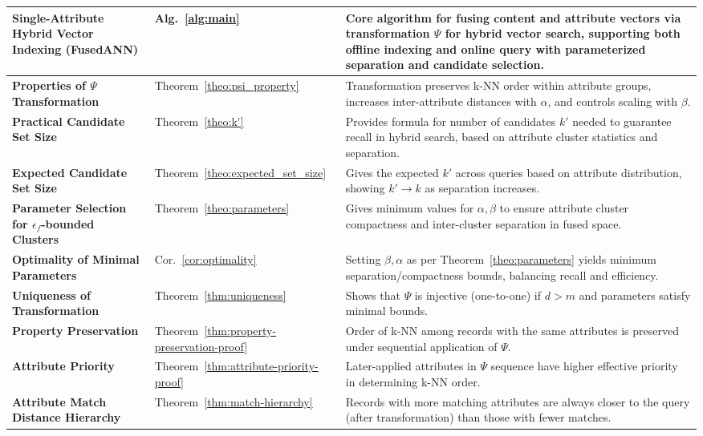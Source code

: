 \documentclass[numbers,sort]{article}
\begin{document}
\begin{longtable}{p{4.5cm} p{1.5cm} p{7.2cm}}
\textbf{Single-Attribute Hybrid Vector Indexing (FusedANN)} & Alg.~\ref{alg:main} & Core algorithm for fusing content and attribute vectors via transformation $\Psi$ for hybrid vector search, supporting both offline indexing and online query with parameterized separation and candidate selection. \\
\midrule
\textbf{Properties of $\Psi$ Transformation} & Theorem~\ref{theo:psi_property} & Transformation preserves k-NN order within attribute groups, increases inter-attribute distances with $\alpha$, and controls scaling with $\beta$. \\
\midrule
\textbf{Practical Candidate Set Size} & Theorem~\ref{theo:k'} & Provides formula for number of candidates $k'$ needed to guarantee recall in hybrid search, based on attribute cluster statistics and separation. \\
\midrule
\textbf{Expected Candidate Set Size} & Theorem~\ref{theo:expected_set_size} & Gives the expected $k'$ across queries based on attribute distribution, showing $k' \to k$ as separation increases. \\
\midrule
\textbf{Parameter Selection for $\epsilon_f$-bounded Clusters} & Theorem~\ref{theo:parameters} & Gives minimum values for $\alpha,\beta$ to ensure attribute cluster compactness and inter-cluster separation in fused space. \\
\midrule
\textbf{Optimality of Minimal Parameters} & Cor.~\ref{cor:optimality} & Setting $\beta, \alpha$ as per Theorem~\ref{theo:parameters} yields minimum separation/compactness bounds, balancing recall and efficiency. \\
\midrule
\textbf{Uniqueness of Transformation} & Theorem~\ref{thm:uniqueness} & Shows that $\Psi$ is injective (one-to-one) if $d>m$ and parameters satisfy minimal bounds. \\
\midrule
\textbf{Property Preservation} & Theorem~\ref{thm:property-preservation-proof} & Order of k-NN among records with the same attributes is preserved under sequential application of $\Psi$. \\
\midrule
\textbf{Attribute Priority} & Theorem~\ref{thm:attribute-priority-proof} & Later-applied attributes in $\Psi$ sequence have higher effective priority in determining k-NN order. \\
\midrule
\textbf{Attribute Match Distance Hierarchy} & Theorem~\ref{thm:match-hierarchy} & Records with more matching attributes are always closer to the query (after transformation) than those with fewer matches. \\

\end{longtable}
\end{document}
